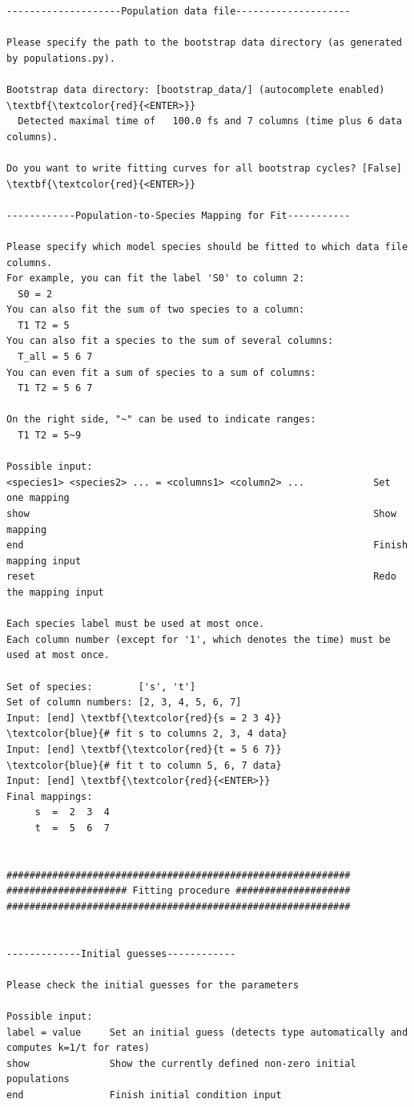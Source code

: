 \documentclass[a4paper,11pt,DIV=15,openany]{scrbook}
\begin{document}
\begin{oframed}
\begin{Verbatim}[commandchars=\\\{\}]
--------------------Population data file--------------------

Please specify the path to the bootstrap data directory (as generated by populations.py).

Bootstrap data directory: [bootstrap_data/] (autocomplete enabled) \textbf{\textcolor{red}{<ENTER>}}
  Detected maximal time of   100.0 fs and 7 columns (time plus 6 data columns).

Do you want to write fitting curves for all bootstrap cycles? [False] \textbf{\textcolor{red}{<ENTER>}}

------------Population-to-Species Mapping for Fit-----------

Please specify which model species should be fitted to which data file columns.
For example, you can fit the label 'S0' to column 2:
  S0 = 2
You can also fit the sum of two species to a column:
  T1 T2 = 5
You can also fit a species to the sum of several columns:
  T_all = 5 6 7
You can even fit a sum of species to a sum of columns:
  T1 T2 = 5 6 7

On the right side, "~" can be used to indicate ranges:
  T1 T2 = 5~9

Possible input:
<species1> <species2> ... = <columns1> <column2> ...            Set one mapping
show                                                            Show mapping
end                                                             Finish mapping input
reset                                                           Redo the mapping input

Each species label must be used at most once.
Each column number (except for '1', which denotes the time) must be used at most once.

Set of species:        ['s', 't']
Set of column numbers: [2, 3, 4, 5, 6, 7]
Input: [end] \textbf{\textcolor{red}{s = 2 3 4}}       \textcolor{blue}{# fit s to columns 2, 3, 4 data}
Input: [end] \textbf{\textcolor{red}{t = 5 6 7}}       \textcolor{blue}{# fit t to column 5, 6, 7 data}
Input: [end] \textbf{\textcolor{red}{<ENTER>}}
Final mappings:
     s  =  2  3  4 
     t  =  5  6  7 


############################################################
##################### Fitting procedure ####################
############################################################


-------------Initial guesses------------

Please check the initial guesses for the parameters

Possible input:
label = value     Set an initial guess (detects type automatically and computes k=1/t for rates)
show              Show the currently defined non-zero initial populations
end               Finish initial condition input


\end{Verbatim}
\end{oframed}
\end{document}
